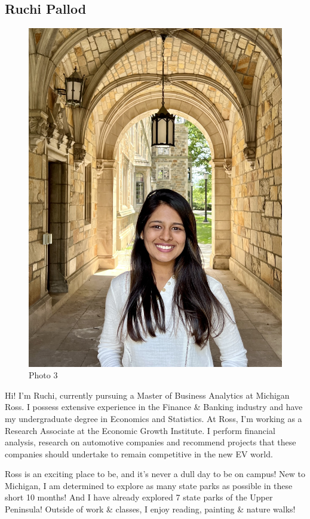 \documentclass[
]{article}
\begin{document}
\hypertarget{ruchi-pallod}{%
\subsection{Ruchi Pallod}\label{ruchi-pallod}}

\begin{figure}
\centering
\includegraphics{Ruchi Profile.jpg}
\caption{Photo 3}
\end{figure}

Hi! I'm Ruchi, currently pursuing a Master of Business Analytics at Michigan Ross. I possess extensive experience in the Finance \& Banking industry and have my undergraduate degree in Economics and Statistics.
At Ross, I'm working as a Research Associate at the Economic Growth Institute. I perform financial analysis, research on automotive companies and recommend projects that these companies should undertake to remain competitive in the new EV world.

Ross is an exciting place to be, and it's never a dull day to be on campus! New to Michigan, I am determined to explore as many state parks as possible in these short 10 months! And I have already explored 7 state parks of the Upper Peninsula! Outside of work \& classes, I enjoy reading, painting \& nature walks!
\end{document}
